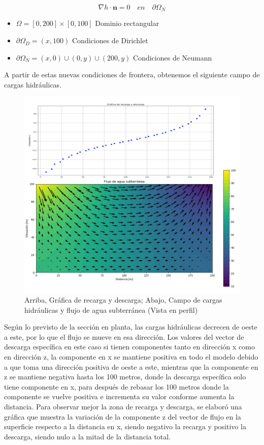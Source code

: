 \begin{equation}
 \label{eqn:mys10}
  {\nabla}h{\cdot}\textbf{n}=0 \quad en \quad {\partial}{\Omega}_{N} 
\end{equation}  

\begin{itemize}
\item  $\Omega=[0,200]{\times}[0,100]$ Dominio rectangular
\item  ${\partial}\Omega_{D}={(x,100)}$ Condiciones de Dirichlet
\item  ${\partial}\Omega_{N}={(x,0){\cup}(0,y){\cup}(200,y)}$ Condiciones de Neumann
\end{itemize}

A partir de estas nuevas condiciones de frontera, obtenemos el siguiente campo de cargas hidráulicas.

 \begin{figure}[H]
\centering
\includegraphics[scale=0.55]{Figure_28c.png}
\caption{Arriba, Gráfica de recarga y descarga; Abajo, Campo de cargas hidráulicas y flujo de agua subterránea (Vista en perfil)}
\label{Figura3:4}
\end{figure}

Según lo previsto de la sección en planta, las cargas hidráulicas decrecen de oeste a este, por lo que el flujo se mueve en esa dirección. Los valores del vector de descarga específica en este caso si tienen componentes tanto en dirección x como en dirección z, la componente en x se mantiene positiva en todo el modelo debido a que toma una dirección positiva de oeste a este, mientras que la componente en z se mantiene negativa hasta los 100 metros, donde la descarga específica solo tiene componente en x, para después de rebasar los 100 metros donde la componente se vuelve positiva e incrementa su valor conforme aumenta la distancia. Para observar mejor la zona de recarga y descarga, se elaboró una gráfica que muestra la variación de la componente z del vector de flujo en la superficie respecto a la distancia en x, siendo negativo la recarga y positivo la descarga, siendo nulo a la mitad de la distancia total.
\\

